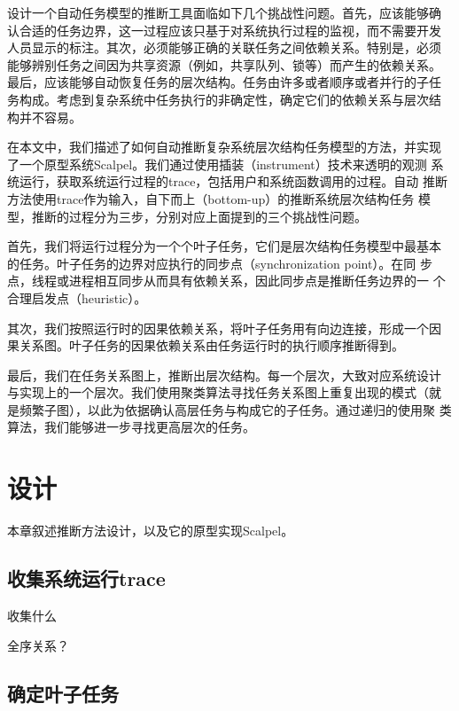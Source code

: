 设计一个自动任务模型的推断工具面临如下几个挑战性问题。首先，应该能够确
认合适的任务边界，这一过程应该只基于对系统执行过程的监视，而不需要开发
人员显示的标注。其次，必须能够正确的关联任务之间依赖关系。特别是，必须
能够辨别任务之间因为共享资源（例如，共享队列、锁等）而产生的依赖关系。
最后，应该能够自动恢复任务的层次结构。任务由许多或者顺序或者并行的子任
务构成。考虑到复杂系统中任务执行的非确定性，确定它们的依赖关系与层次结
构并不容易。

在本文中，我们描述了如何自动推断复杂系统层次结构任务模型的方法，并实现
了一个原型系统Scalpel。我们通过使用插装（instrument）技术来透明的观测
系统运行，获取系统运行过程的trace，包括用户和系统函数调用的过程。自动
推断方法使用trace作为输入，自下而上（bottom-up）的推断系统层次结构任务
模型，推断的过程分为三步，分别对应上面提到的三个挑战性问题。

首先，我们将运行过程分为一个个叶子任务，它们是层次结构任务模型中最基本
的任务。叶子任务的边界对应执行的同步点（synchronization point）。在同
步点，线程或进程相互同步从而具有依赖关系，因此同步点是推断任务边界的一
个合理启发点（heuristic）。

其次，我们按照运行时的因果依赖关系，将叶子任务用有向边连接，形成一个因
果关系图。叶子任务的因果依赖关系由任务运行时的执行顺序推断得到。

最后，我们在任务关系图上，推断出层次结构。每一个层次，大致对应系统设计
与实现上的一个层次。我们使用聚类算法寻找任务关系图上重复出现的模式（就
是频繁子图），以此为依据确认高层任务与构成它的子任务。通过递归的使用聚
类算法，我们能够进一步寻找更高层次的任务。




\section{设计}

本章叙述推断方法设计，以及它的原型实现\pozhehao{}Scalpel。

\subsection{收集系统运行trace}
收集什么

全序关系？



\subsection{确定叶子任务}

